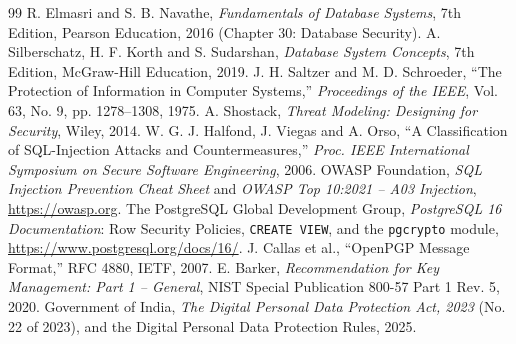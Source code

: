 \documentclass[11pt,a4paper]{report}
\begin{document}
\begin{thebibliography}{99}
     R. Elmasri and S. B. Navathe, \textit{Fundamentals of Database Systems}, 7th Edition, Pearson Education, 2016 (Chapter 30: Database Security).
     A. Silberschatz, H. F. Korth and S. Sudarshan, \textit{Database System Concepts}, 7th Edition, McGraw-Hill Education, 2019.
     J. H. Saltzer and M. D. Schroeder, ``The Protection of Information in Computer Systems,'' \textit{Proceedings of the IEEE}, Vol. 63, No. 9, pp. 1278--1308, 1975.
     A. Shostack, \textit{Threat Modeling: Designing for Security}, Wiley, 2014.
     W. G. J. Halfond, J. Viegas and A. Orso, ``A Classification of SQL-Injection Attacks and Countermeasures,'' \textit{Proc. IEEE International Symposium on Secure Software Engineering}, 2006.
     OWASP Foundation, \textit{SQL Injection Prevention Cheat Sheet} and \textit{OWASP Top 10:2021 -- A03 Injection}, \url{https://owasp.org}.
     The PostgreSQL Global Development Group, \textit{PostgreSQL 16 Documentation}: Row Security Policies, \texttt{CREATE VIEW}, and the \texttt{pgcrypto} module, \url{https://www.postgresql.org/docs/16/}.
     J. Callas et al., ``OpenPGP Message Format,'' RFC 4880, IETF, 2007.
     E. Barker, \textit{Recommendation for Key Management: Part 1 -- General}, NIST Special Publication 800-57 Part 1 Rev. 5, 2020.
     Government of India, \textit{The Digital Personal Data Protection Act, 2023} (No. 22 of 2023), and the Digital Personal Data Protection Rules, 2025.
\end{thebibliography}
\end{document}
